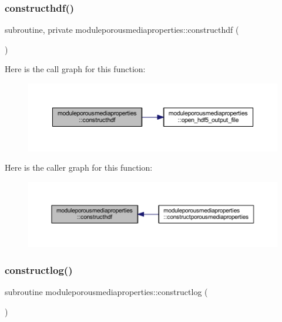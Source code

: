 \subsubsection{\texorpdfstring{constructhdf()}{constructhdf()}}
{\footnotesize\ttfamily subroutine, private moduleporousmediaproperties\+::constructhdf (\begin{DoxyParamCaption}{ }\end{DoxyParamCaption})\hspace{0.3cm}{\ttfamily [private]}}

Here is the call graph for this function\+:\nopagebreak
\begin{figure}[H]
\begin{center}
\leavevmode
\includegraphics[width=350pt]{namespacemoduleporousmediaproperties_aecdb9ca882593072d63d590749b53ee9_cgraph}
\end{center}
\end{figure}
Here is the caller graph for this function\+:\nopagebreak
\begin{figure}[H]
\begin{center}
\leavevmode
\includegraphics[width=350pt]{namespacemoduleporousmediaproperties_aecdb9ca882593072d63d590749b53ee9_icgraph}
\end{center}
\end{figure}
\mbox{\label{namespacemoduleporousmediaproperties_a2bfe4b92207b55cc4167ccce04ea859f}} 
\subsubsection{\texorpdfstring{constructlog()}{constructlog()}}
{\footnotesize\ttfamily subroutine moduleporousmediaproperties\+::constructlog (\begin{DoxyParamCaption}{ }\end{DoxyParamCaption})\hspace{0.3cm}{\ttfamily [private]}}

